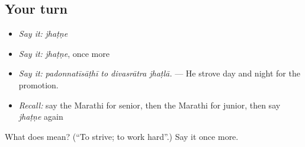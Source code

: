 \subsection*{Your turn}
\begin{itemize}
\raggedright
  \item \emph{Say it:} \emph{jhaṭṇe}
  \item \emph{Say it:} \emph{jhaṭṇe}, once more
  \item \emph{Say it:} \emph{padonnatīsāṭhī to divasrātra jhaṭlā.} — He strove day and night for the promotion.
  \item \emph{Recall:} say the Marathi for senior, then the Marathi for junior, then say \emph{jhaṭṇe} again
\end{itemize}

\begin{tcolorbox}[breakable,colback=teal!4,colframe=teal!35!black,title={Before you move on}]
What does  mean? (\textquotedblleft{}To strive; to work hard\textquotedblright{}.) Say it once more.
\end{tcolorbox}
